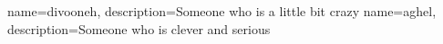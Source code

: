 {
        name=divooneh,
        description={Someone who is a little bit crazy}
}
{
        name=aghel,
        description={Someone who is clever and serious}
}